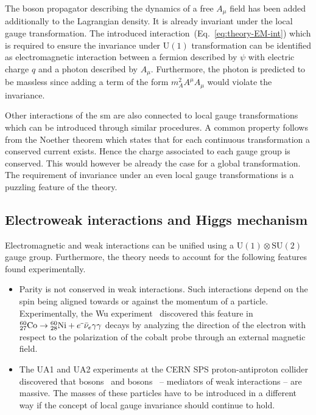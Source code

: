 The boson propagator describing the dynamics of a free $A_\mu$ field has been added additionally to the Lagrangian density. It is already invariant under the local gauge transformation. The introduced interaction~(Eq.~\ref{eq:theory-EM-int}) which is required to ensure the invariance under $\mathrm{U(1)}$ transformation can be identified as electromagnetic interaction between a fermion described by $\psi$ with electric charge $q$ and a photon described by $A_\mu$. Furthermore, the photon is predicted to be massless since adding a term of the form $m^{2}_{A}A^\mu A_\mu$ would violate the invariance.

Other interactions of the \gls{sm} are also connected to local gauge transformations which can be introduced through similar procedures. A common property follows from the Noether theorem which states that for each continuous transformation a conserved current exists. Hence the charge associated to each gauge group is conserved. This would however be already the case for a global transformation. The requirement of invariance under an even local gauge transformations is a puzzling feature of the theory. 

\subsection{Electroweak interactions and Higgs mechanism}
\label{sec:theory-ewk}

Electromagnetic and weak interactions can be unified using a $\mathrm{U(1)}\otimes \mathrm{SU(2)}$ gauge group. Furthermore, the theory needs to account for the following features found experimentally.

\begin{itemize}

\item Parity is not conserved in weak interactions. Such interactions depend on the spin being aligned towards or against the momentum of a particle. Experimentally, the Wu experiment~\cite{PhysRev.105.1413} discovered this feature in ${}_{27}^{60}\mathrm{Co}\to{}_{28}^{60}\mathrm{Ni}+e^{\rmminus}\bar{\nu}_{e}\gamma\gamma$ decays by analyzing the direction of the electron with respect to the polarization of the cobalt probe through an external magnetic field. 

\item The UA1 and UA2 experiments at the CERN SPS proton-antiproton collider discovered that \wboson bosons~\cite{Arnison:1983rp,Banner:1983jy} and \zboson bosons~\cite{Arnison:1983mk,Bagnaia:1983zx} -- mediators of weak interactions -- are massive. The masses of these particles have to be introduced in a different way if the concept of local gauge invariance should continue to hold.

\end{itemize}

